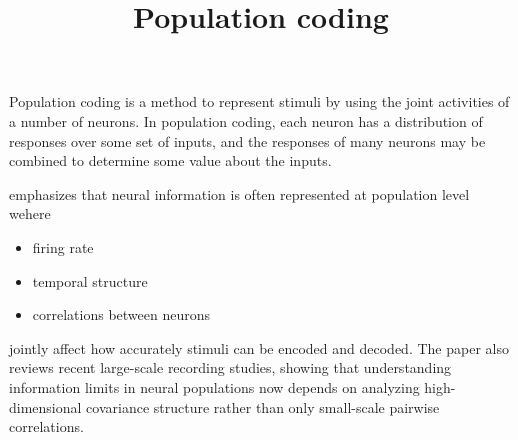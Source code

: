 \documentclass[a4paper]{article}
\title{Population coding}
\date{}
\begin{document}
    \maketitle
    Population coding is a method to represent stimuli by using the joint activities of a number of neurons. In population coding, each neuron has a distribution of responses over some set of inputs, and the responses of many neurons may be combined to determine some value about the inputs.
    
    \cite{shimazaki-2025-neural-coding-foundational-concepts-statistical-formulations-and-recent-advances} emphasizes that neural information is often represented at population level wehere
    
    \begin{itemize}
        \item firing rate
        \item temporal structure
        \item correlations between neurons
    \end{itemize}
    jointly affect how accurately stimuli can be encoded and decoded. The paper also reviews recent large-scale recording studies, showing that understanding information limits in neural populations now depends on analyzing high-dimensional covariance structure rather than only small-scale pairwise correlations.
    \cite{shimazaki-2025-neural-coding-foundational-concepts-statistical-formulations-and-recent-advances}
    
    
\end{document}
